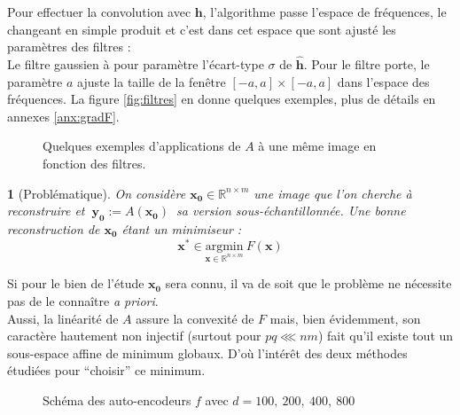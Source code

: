\documentclass[hidelinks, french]{article} %
\newcommand{\R}{\mathbb{R}}
\newcommand{\apriori}{\textit{a priori}}
\newcommand{\argmin}[1]{\underset{#1}{\text{argmin}}}
\renewcommand{\bf}[1]{\boldsymbol{#1}}
\theoremstyle{enonce}
\theoremstyle{special}
\newtheorem{enonce}{}
\theoremstyle{rq}
\theoremstyle{exo}
\theoremstyle{demo}
\begin{document}
Pour effectuer la convolution avec $\bf{h}$, l'algorithme passe l'espace de fréquences, le changeant en simple produit et c'est dans cet espace que sont ajusté les paramètres des filtres :
\\
Le filtre gaussien à pour paramètre l'écart-type $\sigma$ de $\hat{\bf{h}}$. Pour le filtre porte, le paramètre $a$ ajuste la taille de la fenêtre $[-a,a]\times[-a,a]$ dans l'espace des fréquences. La figure \ref{fig:filtres} en donne quelques exemples, plus de détails en annexes \ref{anx:gradF}.
\\

\begin{figure}[b]
	\begin{floatrow}
		{
		}
		
		{
		}
	\end{floatrow}
\end{figure}

\begin{figure}[h]\centering
	
	\caption{Quelques exemples d'applications de $A$ à une même image en fonction des filtres. }
\end{figure}

\begin{enonce}[Problématique]
	On considère $\bf{x_0}\in\R^{n\times m}$ une image que l'on cherche à reconstruire et $\ \bf{y_0}:=A(\bf{x_0})\ $ sa version sous-échantillonnée. Une bonne reconstruction de $\bf{x_0}$ étant un minimiseur :
	\begin{equation}\label{eq:probleme}
		\bf{x^*}\in \argmin{\bf{x}\in\R^{n\times m}}\ F(\bf{x})\end{equation}\end{enonce}

Si pour le bien de l'étude $\bf{x_0}$ sera connu, il va de soit que le problème ne nécessite pas de le connaître \apriori.
\\
Aussi, la linéarité de $A$ assure la convexité de $F$ mais, bien évidemment, son caractère hautement non injectif (surtout pour $pq\lll nm$) fait qu'il existe tout un sous-espace affine de minimum globaux. D'où l'intérêt des deux méthodes étudiées pour ``choisir'' ce minimum.
\\

\begin{wrapfigure}{r}{0.4\textwidth}%
	
	\caption{Schéma des auto-encodeurs  $f$ avec $d=100,\ 200,\ 400,\ 800$}
	\label{fig:AEschem}
\end{wrapfigure}
\end{document}
